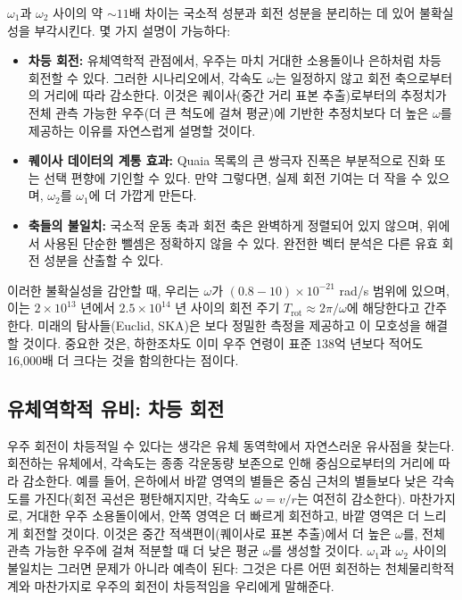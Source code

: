 \documentclass[11pt,a4paper]{article}
\begin{document}
	\(\omega_1\)과 \(\omega_2\) 사이의 약 \(\sim11\)배 차이는 국소적 성분과 회전 성분을 분리하는 데 있어 불확실성을 부각시킨다. 몇 가지 설명이 가능하다:
	\begin{itemize}
		\item \textbf{차등 회전:} 유체역학적 관점에서, 우주는 마치 거대한 소용돌이나 은하처럼 차등 회전할 수 있다. 그러한 시나리오에서, 각속도 \(\omega\)는 일정하지 않고 회전 축으로부터의 거리에 따라 감소한다. 이것은 퀘이사(중간 거리 표본 추출)로부터의 추정치가 전체 관측 가능한 우주(더 큰 척도에 걸쳐 평균)에 기반한 추정치보다 더 높은 \(\omega\)를 제공하는 이유를 자연스럽게 설명할 것이다.
		\item \textbf{퀘이사 데이터의 계통 효과:} Quaia 목록의 큰 쌍극자 진폭은 부분적으로 진화 또는 선택 편향에 기인할 수 있다. 만약 그렇다면, 실제 회전 기여는 더 작을 수 있으며, \(\omega_2\)를 \(\omega_1\)에 더 가깝게 만든다.
		\item \textbf{축들의 불일치:} 국소적 운동 축과 회전 축은 완벽하게 정렬되어 있지 않으며, 위에서 사용된 단순한 뺄셈은 정확하지 않을 수 있다. 완전한 벡터 분석은 다른 유효 회전 성분을 산출할 수 있다.
	\end{itemize}
	이러한 불확실성을 감안할 때, 우리는 \(\omega\)가 \((0.8-10)\times10^{-21}\) rad/s 범위에 있으며, 이는 \(2\times10^{13}\) 년에서 \(2.5\times10^{14}\) 년 사이의 회전 주기 \(T_{\text{rot}} \approx 2\pi/\omega\)에 해당한다고 간주한다. 미래의 탐사들(Euclid, SKA)은 보다 정밀한 측정을 제공하고 이 모호성을 해결할 것이다. 중요한 것은, 하한조차도 이미 우주 연령이 표준 138억 년보다 적어도 16,000배 더 크다는 것을 함의한다는 점이다.
	
	\subsection{유체역학적 유비: 차등 회전}
	
	우주 회전이 차등적일 수 있다는 생각은 유체 동역학에서 자연스러운 유사점을 찾는다. 회전하는 유체에서, 각속도는 종종 각운동량 보존으로 인해 중심으로부터의 거리에 따라 감소한다. 예를 들어, 은하에서 바깥 영역의 별들은 중심 근처의 별들보다 낮은 각속도를 가진다(회전 곡선은 평탄해지지만, 각속도 \(\omega = v/r\)는 여전히 감소한다). 마찬가지로, 거대한 우주 소용돌이에서, 안쪽 영역은 더 빠르게 회전하고, 바깥 영역은 더 느리게 회전할 것이다. 이것은 중간 적색편이(퀘이사로 표본 추출)에서 더 높은 \(\omega\)를, 전체 관측 가능한 우주에 걸쳐 적분할 때 더 낮은 평균 \(\omega\)를 생성할 것이다. \(\omega_1\)과 \(\omega_2\) 사이의 불일치는 그러면 문제가 아니라 예측이 된다: 그것은 다른 어떤 회전하는 천체물리학적 계와 마찬가지로 우주의 회전이 차등적임을 우리에게 말해준다.
	
\end{document}
